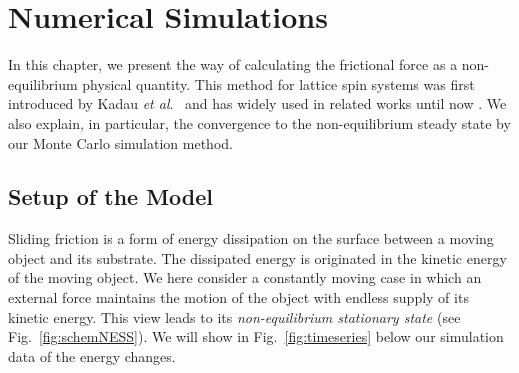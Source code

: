 \chapter{Numerical Simulations}\label{chap:NumSim}

In this chapter, we present the way of calculating the frictional force as a non-equilibrium physical quantity. This method for lattice spin systems was first introduced by Kadau \textit{et al}.\ \cite{Kadau2008} and has widely used in related works until now \cite{Hucht2009b,Magiera2011,Igloi2011,Hucht2012a,Angst2012,Li2016b}. We also explain, in particular, the convergence to the non-equilibrium steady state by our Monte Carlo simulation method.

\section{Setup of the Model}\label{sec:SetupModel}
Sliding friction is a form of energy dissipation on the surface between a moving object and its substrate. The dissipated energy is originated in the kinetic energy of the moving object. We here consider a constantly moving case in which an external force maintains the motion of the object with endless supply of its kinetic energy. This view leads to its \textit{non-equilibrium stationary state} (see Fig.~\ref{fig:schemNESS}). We will show in Fig.~\ref{fig:timeseries} below our simulation data of the energy changes.
